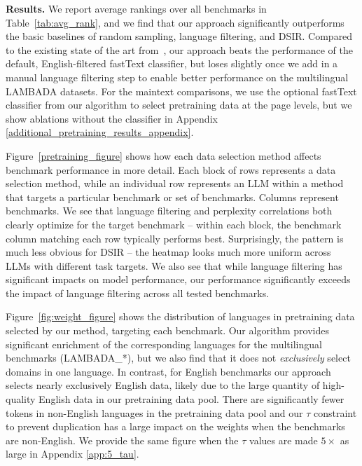 \documentclass{article} %
\begin{document}
\textbf{Results.} We report average rankings over all benchmarks in Table~\ref{tab:avg_rank}, and we find that our approach significantly outperforms the basic baselines of random sampling, language filtering, and DSIR. Compared to the existing state of the art from~\citet{datacomp}, our approach beats the performance of the default, English-filtered fastText classifier, but loses slightly once we add in a manual language filtering step to enable better performance on the multilingual LAMBADA datasets. For the maintext comparisons, we use the optional fastText classifier from our algorithm to select pretraining data at the page levels, but we show ablations without the classifier in Appendix \ref{additional_pretraining_results_appendix}.

Figure~\ref{pretraining_figure} shows how each data selection method affects benchmark performance in more detail. Each block of rows represents a data selection method, while an individual row represents an LLM within a method that targets a particular benchmark or set of benchmarks. Columns represent benchmarks. We see that language filtering and perplexity correlations both clearly optimize for the target benchmark -- within each block, the benchmark column matching each row typically performs best. Surprisingly, the pattern is much less obvious for DSIR -- the heatmap looks much more uniform across LLMs with different task targets. We also see that while language filtering has significant impacts on model performance, our performance significantly exceeds the impact of language filtering across all tested benchmarks.

Figure~\ref{fig:weight_figure} shows the distribution of languages in pretraining data selected by our method, targeting each benchmark. Our algorithm provides significant enrichment of the corresponding languages for the multilingual benchmarks (LAMBADA\_*), but we also find that it does not \emph{exclusively} select domains in one language. In contrast, for English benchmarks our approach selects nearly exclusively English data, likely due to the large quantity of high-quality English data in our pretraining data pool. There are significantly fewer tokens in non-English languages in the pretraining data pool and our $\tau$ constraint to prevent duplication has a large impact on the weights when the benchmarks are non-English. We provide the same figure when the $\tau$ values are made $5\times$ as large in Appendix \ref{app:5_tau}.
\end{document}
